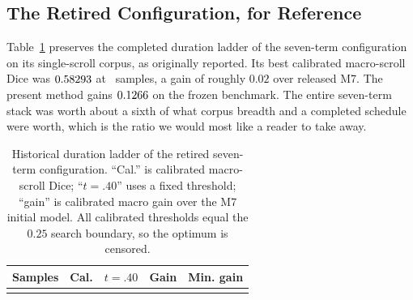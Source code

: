 \subsection{The Retired Configuration, for Reference}
\label{sec:also-v31}

Table~\ref{tab:duration} preserves the completed duration ladder of the
seven-term configuration on its single-scroll corpus, as originally reported.
Its best calibrated macro-scroll Dice was $0.58293$ at \bestSamplesText\
samples, a gain of roughly $0.02$ over released M7.
The present method gains $0.1266$ on the frozen benchmark.
The entire seven-term stack was worth about a sixth of what corpus breadth and
a completed schedule were worth, which is the ratio we would most like a reader
to take away.

\begin{table}[t]
\caption{Historical duration ladder of the retired seven-term configuration.
``Cal.'' is calibrated macro-scroll Dice; ``$t=.40$'' uses a fixed threshold;
``gain'' is calibrated macro gain over the M7 initial model. All calibrated
thresholds equal the $0.25$ search boundary, so the optimum is censored.}
\label{tab:duration}
\centering
\small
\begin{tabular}{rrrrr}
\toprule
Samples & Cal. & $t=.40$ & Gain & Min. gain \\
\midrule
\durationRows
\bottomrule
\end{tabular}
\end{table}
